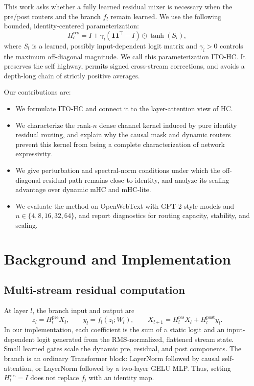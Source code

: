 \documentclass{article}
\newcommand{\Hpre}{H^{\mathrm{pre}}}
\newcommand{\Hpost}{H^{\mathrm{post}}}
\newcommand{\Hres}{H^{\mathrm{res}}}
\begin{document}
This work asks whether a fully learned residual mixer is necessary when the pre/post routers and the branch $f_l$ remain learned. We use the following bounded, identity-centered parameterization:
\begin{equation}
 \Hres_l=I+\gamma_l(\mathbf 1\mathbf 1^\top-I)\odot\tanh(S_l),
 \label{eq:method-short}
\end{equation}
where $S_l$ is a learned, possibly input-dependent logit matrix and $\gamma_l>0$ controls the maximum off-diagonal magnitude. We call this parameterization ITO-HC. It preserves the self highway, permits signed cross-stream corrections, and avoids a depth-long chain of strictly positive averages.

Our contributions are:
\begin{itemize}
\item We formulate ITO-HC and connect it to the layer-attention view of HC.
\item We characterize the rank-$n$ dense channel kernel induced by pure identity residual routing, and explain why the causal mask and dynamic routers prevent this kernel from being a complete characterization of network expressivity.
\item We give perturbation and spectral-norm conditions under which the off-diagonal residual path remains close to identity, and analyze its scaling advantage over dynamic mHC and mHC-lite.
\item We evaluate the method on OpenWebText with GPT-2-style models and $n\in\{4,8,16,32,64\}$, and report diagnostics for routing capacity, stability, and scaling.
\end{itemize}

\section{Background and Implementation}

\subsection{Multi-stream residual computation}
At layer $l$, the branch input and output are
\begin{equation}
 z_l=\Hpre_l X_l,\qquad y_l=f_l(z_l;W_l),\qquad
 X_{l+1}=\Hres_lX_l+\Hpost_l y_l.
 \label{eq:update}
\end{equation}
In our implementation, each coefficient is the sum of a static logit and an input-dependent logit generated from the RMS-normalized, flattened stream state. Small learned gates scale the dynamic pre, residual, and post components. The branch is an ordinary Transformer block: LayerNorm followed by causal self-attention, or LayerNorm followed by a two-layer GELU MLP. Thus, setting $\Hres_l=I$ does not replace $f_l$ with an identity map.
\end{document}
